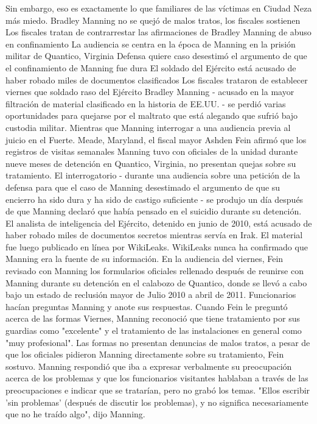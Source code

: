 Sin embargo, eso es exactamente lo que familiares de las víctimas en Ciudad Neza más miedo.
Bradley Manning no se quejó de malos tratos, los fiscales sostienen
Los fiscales tratan de contrarrestar las afirmaciones de Bradley Manning de abuso en confinamiento
La audiencia se centra en la época de Manning en la prisión militar de Quantico, Virginia
Defensa quiere caso desestimó el argumento de que el confinamiento de Manning fue dura
El soldado del Ejército está acusado de haber robado miles de documentos clasificados
Los fiscales trataron de establecer viernes que soldado raso del Ejército Bradley Manning - acusado en la mayor filtración de material clasificado en la historia de EE.UU. - se perdió varias oportunidades para quejarse por el maltrato que está alegando que sufrió bajo custodia militar.
Mientras que Manning interrogar a una audiencia previa al juicio en el Fuerte. Meade, Maryland, el fiscal mayor Ashden Fein afirmó que los registros de visitas semanales Manning tuvo con oficiales de la unidad durante nueve meses de detención en Quantico, Virginia, no presentan quejas sobre su tratamiento.
El interrogatorio - durante una audiencia sobre una petición de la defensa para que el caso de Manning desestimado el argumento de que su encierro ha sido dura y ha sido de castigo suficiente - se produjo un día después de que Manning declaró que había pensado en el suicidio durante su detención.
El analista de inteligencia del Ejército, detenido en junio de 2010, está acusado de haber robado miles de documentos secretos mientras servía en Irak.
El material fue luego publicado en línea por WikiLeaks.
WikiLeaks nunca ha confirmado que Manning era la fuente de su información.
En la audiencia del viernes, Fein revisado con Manning los formularios oficiales rellenado después de reunirse con Manning durante su detención en el calabozo de Quantico, donde se llevó a cabo bajo un estado de reclusión mayor de Julio 2010 a abril de 2011.
Funcionarios hacían preguntas Manning y anote sus respuestas.
Cuando Fein le preguntó acerca de las formas Viernes, Manning reconoció que tiene tratamiento por sus guardias como "excelente" y el tratamiento de las instalaciones en general como "muy profesional".
Las formas no presentan denuncias de malos tratos, a pesar de que los oficiales pidieron Manning directamente sobre su tratamiento, Fein sostuvo.
Manning respondió que iba a expresar verbalmente su preocupación acerca de los problemas y que los funcionarios visitantes hablaban a través de las preocupaciones e indicar que se tratarían, pero no grabó los temas.
"Ellos escribir 'sin problemas' (después de discutir los problemas), y no significa necesariamente que no he traído algo", dijo Manning.
